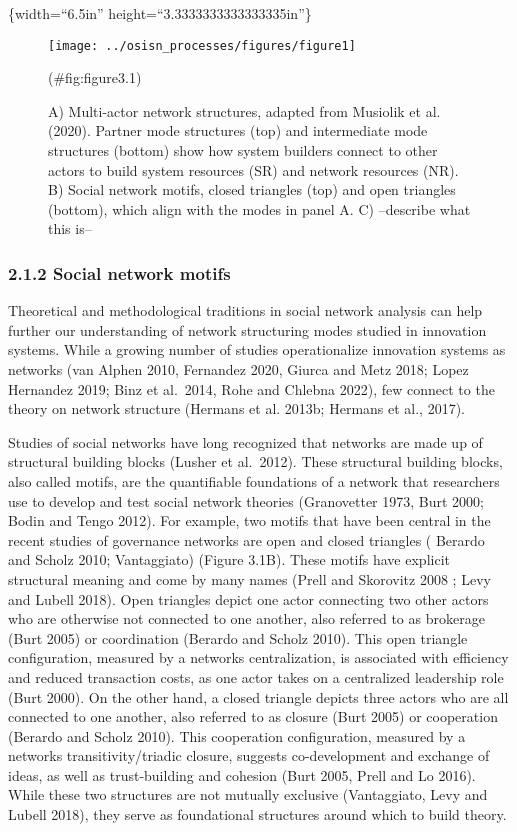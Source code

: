 \documentclass[twoside,12pt,final]{ucthesis-CA2012}
\begin{document}
\begin{ucmainmatter}
\{width=``6.5in'' height=``3.3333333333333335in''\}
\begin{figure}

{\centering \texttt{[image: ../osisn\_processes/figures/figure1]} 

}

\caption{A) Multi-actor network structures, adapted from Musiolik et al. (2020). Partner mode structures (top) and intermediate mode structures (bottom) show how system builders connect to other actors to build system resources (SR) and network resources (NR). B) Social network motifs, closed triangles (top) and open triangles (bottom), which align with the modes in panel A. C) --describe what this is-- }(\#fig:figure3.1)
\end{figure}
\hypertarget{social-network-motifs}{%
\subsubsection{2.1.2 Social network motifs}\label{social-network-motifs}}

Theoretical and methodological traditions in social network analysis can
help further our understanding of network structuring modes studied in
innovation systems. While a growing number of studies operationalize
innovation systems as networks (van Alphen 2010, Fernandez 2020, Giurca
and Metz 2018; Lopez Hernandez 2019; Binz et al.~2014, Rohe and Chlebna
2022), few connect to the theory on network structure (Hermans et al.
2013b; Hermans et al., 2017).

Studies of social networks have long recognized that networks are made
up of structural building blocks (Lusher et al.~2012). These structural
building blocks, also called motifs, are the quantifiable foundations of
a network that researchers use to develop and test social network
theories (Granovetter 1973, Burt 2000; Bodin and Tengo 2012). For
example, two motifs that have been central in the recent studies of
governance networks are open and closed triangles ( Berardo and Scholz
2010; Vantaggiato) (Figure 3.1B). These motifs have explicit structural
meaning and come by many names (Prell and Skorovitz 2008 ; Levy and
Lubell 2018). Open triangles depict one actor connecting two other
actors who are otherwise not connected to one another, also referred to
as brokerage (Burt 2005) or coordination (Berardo and Scholz 2010). This
open triangle configuration, measured by a network\textquotesingle s
\textquotesingle centralization\textquotesingle, is associated with efficiency and reduced
transaction costs, as one actor takes on a centralized leadership role
(Burt 2000). On the other hand, a closed triangle depicts three actors
who are all connected to one another, also referred to as closure (Burt
2005) or cooperation (Berardo and Scholz 2010). This cooperation
configuration, measured by a network\textquotesingle s \textquotesingle transitivity\textquotesingle/\textquotesingle triadic
closure\textquotesingle, suggests co-development and exchange of ideas, as well as
trust-building and cohesion (Burt 2005, Prell and Lo 2016). While these
two structures are not mutually exclusive (Vantaggiato, Levy and Lubell
2018), they serve as foundational structures around which to build
theory.


\end{ucmainmatter}
\end{document}
